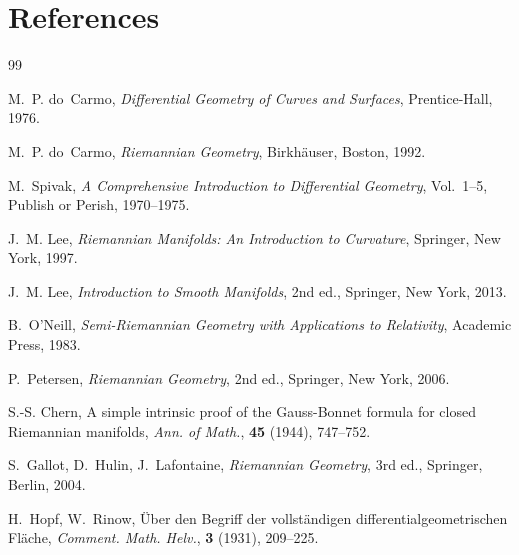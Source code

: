 \documentclass[12pt,a4paper]{amsart}
\theoremstyle{definition}
\begin{document}
\section*{References}

\begin{thebibliography}{99}

M.~P. do~Carmo,
\textit{Differential Geometry of Curves and Surfaces},
Prentice-Hall, 1976.

M.~P. do~Carmo,
\textit{Riemannian Geometry},
Birkh\"auser, Boston, 1992.

M.~Spivak,
\textit{A Comprehensive Introduction to Differential Geometry},
Vol.~1--5, Publish or Perish, 1970--1975.

J.~M. Lee,
\textit{Riemannian Manifolds: An Introduction to Curvature},
Springer, New York, 1997.

J.~M. Lee,
\textit{Introduction to Smooth Manifolds},
2nd ed., Springer, New York, 2013.

B.~O'Neill,
\textit{Semi-Riemannian Geometry with Applications to Relativity},
Academic Press, 1983.

P.~Petersen,
\textit{Riemannian Geometry},
2nd ed., Springer, New York, 2006.

S.-S. Chern,
A simple intrinsic proof of the Gauss-Bonnet formula for closed Riemannian manifolds,
\textit{Ann. of Math.}, \textbf{45} (1944), 747--752.

S.~Gallot, D.~Hulin, J.~Lafontaine,
\textit{Riemannian Geometry},
3rd ed., Springer, Berlin, 2004.

H.~Hopf, W.~Rinow,
\"Uber den Begriff der vollst\"andigen differentialgeometrischen Fl\"ache,
\textit{Comment. Math. Helv.}, \textbf{3} (1931), 209--225.

\end{thebibliography}
\end{document}
